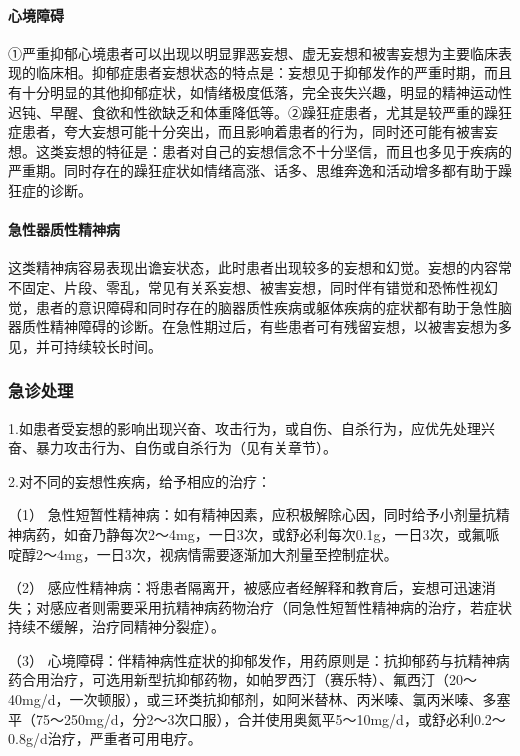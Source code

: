 \paragraph{心境障碍}

①严重抑郁心境患者可以出现以明显罪恶妄想、虚无妄想和被害妄想为主要临床表现的临床相。抑郁症患者妄想状态的特点是：妄想见于抑郁发作的严重时期，而且有十分明显的其他抑郁症状，如情绪极度低落，完全丧失兴趣，明显的精神运动性迟钝、早醒、食欲和性欲缺乏和体重降低等。②躁狂症患者，尤其是较严重的躁狂症患者，夸大妄想可能十分突出，而且影响着患者的行为，同时还可能有被害妄想。这类妄想的特征是：患者对自己的妄想信念不十分坚信，而且也多见于疾病的严重期。同时存在的躁狂症状如情绪高涨、话多、思维奔逸和活动增多都有助于躁狂症的诊断。

\paragraph{急性器质性精神病}

这类精神病容易表现出谵妄状态，此时患者出现较多的妄想和幻觉。妄想的内容常不固定、片段、零乱，常见有关系妄想、被害妄想，同时伴有错觉和恐怖性视幻觉，患者的意识障碍和同时存在的脑器质性疾病或躯体疾病的症状都有助于急性脑器质性精神障碍的诊断。在急性期过后，有些患者可有残留妄想，以被害妄想为多见，并可持续较长时间。

\subsubsection{急诊处理}

1.如患者受妄想的影响出现兴奋、攻击行为，或自伤、自杀行为，应优先处理兴奋、暴力攻击行为、自伤或自杀行为（见有关章节）。

2.对不同的妄想性疾病，给予相应的治疗：

（1）
急性短暂性精神病：如有精神因素，应积极解除心因，同时给予小剂量抗精神病药，如奋乃静每次2～4mg，一日3次，或舒必利每次0.1g，一日3次，或氟哌啶醇2～4mg，一日3次，视病情需要逐渐加大剂量至控制症状。

（2）
感应性精神病：将患者隔离开，被感应者经解释和教育后，妄想可迅速消失；对感应者则需要采用抗精神病药物治疗（同急性短暂性精神病的治疗，若症状持续不缓解，治疗同精神分裂症）。

（3）
心境障碍：伴精神病性症状的抑郁发作，用药原则是：抗抑郁药与抗精神病药合用治疗，可选用新型抗抑郁药物，如帕罗西汀（赛乐特）、氟西汀（20～40mg/d，一次顿服），或三环类抗抑郁剂，如阿米替林、丙米嗪、氯丙米嗪、多塞平（75～250mg/d，分2～3次口服），合并使用奥氮平5～10mg/d，或舒必利0.2～0.8g/d治疗，严重者可用电疗。

